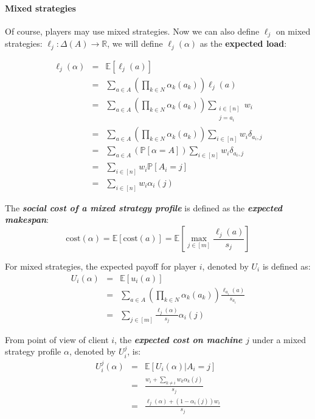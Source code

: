 \documentclass[a4paper,11pt]{article}
\newcommand{\R}{{\mathbb R}}
\renewcommand{\P}{{\mathbb P}}
\newcommand{\E}{{\mathbb E}}
\newcommand{\cost}{\text{cost}}
\begin{document}
\paragraph{Mixed strategies}
Of course, players may use mixed strategies. Now we can also define $\ell_j$ on mixed strategies: $\ell_j: \Delta(A) \rightarrow \R$, we will define $\ell_j(\alpha)$ as the \textbf{expected load}:

\begin{eqnarray*}
\ell_j(\alpha)  &=& \E[\ell_j(a)] \\
                &=&  \displaystyle\sum_{a \in A}{\left(\prod_{k \in N}{\alpha_k(a_k)}\right) \ell_j(a)}\\
                &=& \displaystyle\sum_{a \in A}{\left(\prod_{k \in N}{\alpha_k(a_k)}\right) \sum_{\substack{i \in [n]\\j = a_i}}{w_i} }\\
                &=& \displaystyle\sum_{a \in A}{\left(\prod_{k \in N}{\alpha_k(a_k)}\right) \sum_{i \in [n]}{w_i\delta_{a_i,j}}}\\
                 &=&  \displaystyle\sum_{a \in A}{\left(\P[\alpha = A]\right)\sum_{i \in [n]}{w_i\delta_{a_i,j}}}\\
                &=& \sum_{i \in [n]}{w_i}\P[A_i = j]\\
                &=& \sum_{i \in [n]}{w_i}\alpha_i(j)
\end{eqnarray*}

The \emph\textbf{{social cost of a mixed strategy profile}} is defined as the \emph\textbf{{expected makespan}}:
$$\cost(\alpha) = \E[\cost(a)] = \E\left[\max_{j\in[m]}\frac{\ell_j(a)}{s_{j}}\right]$$

For mixed strategies, the expected payoff for player $i$, denoted by $U_i$ is defined as:
\begin{eqnarray*}
U_i(\alpha) &=& \E[u_i(a)]\\
  &=&  \displaystyle\sum_{a \in A}{\left(\prod_{k \in N}{\alpha_k(a_k)}\right) \frac{\ell_{a_i}(a)}{s_{a_i}}}\\
  &=& \displaystyle\sum_{j \in [m]}{\frac{\ell_j(\alpha)}{s_j}\alpha_i(j)}
\end{eqnarray*}

From point of view of client $i$, the \emph{\textbf{expected cost on machine $j$}} under a mixed strategy profile $\alpha$, denoted by $U^j_i$, is:
\begin{eqnarray*}
U^j_i(\alpha) &=& \E[U_i(\alpha)|A_i=j]\\
  &=& \frac{w_i + \sum_{k\neq i}{w_k\alpha_k(j)}}{s_j} \\
  &=&  \frac{\ell_j(\alpha) + (1 - \alpha_i(j))w_i}{s_j}\\
\end{eqnarray*}
\end{document}
